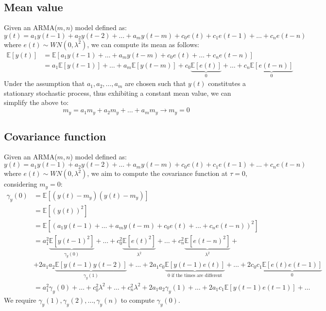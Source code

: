 \subsection{Mean value}
Given an ARMA($m,n$) model defined as:
\[y(t)=a_1y(t-1)+a_2y(t-2)+\dots+a_my(t-m)+c_0e(t)+c_1e(t-1)+\dots+c_ne(t-n)\]
where $e(t)\sim WN(0,\lambda^2)$, we can compute its mean as follows:
\begin{align*}
    \mathbb{E}\left[y(t)\right] &= \mathbb{E}\left[a_1y(t-1)+\dots+a_my(t-m)+c_0e(t)+\dots+c_ne(t-n)\right] \\
                                &= a_1\mathbb{E}\left[y(t-1)\right]+\dots+a_m\mathbb{E}\left[y(t-m)\right] +c_0\underbrace{\mathbb{E}\left[e(t)\right]}_0 +\dots+c_n\underbrace{\mathbb{E}\left[e(t-n)\right]}_0
\end{align*}
Under the assumption that $a_1,a_2,\dots,a_m$ are chosen such that $y(t)$ constitutes a stationary stochastic process, thus exhibiting a constant mean value, we can simplify the above to:
\[m_y=a_1m_y+a_2m_y+\dots+a_mm_y \rightarrow m_y=0\]

\subsection{Covariance function}
Given an ARMA($m,n$) model defined as:
\[y(t)=a_1y(t-1)+a_2y(t-2)+\dots+a_my(t-m)+c_0e(t)+c_1e(t-1)+\dots+c_ne(t-n)\]
where $e(t)\sim WN(0,\lambda^2)$, we aim to compute the covariance function at $\tau=0$, considering $m_y=0$:
\begin{align*}
    \gamma_y(0) &=\mathbb{E}\left[ \left(y(t)-m_y\right)\left(y(t)-m_y\right) \right] \\
                &=\mathbb{E}\left[ \left(y(t)\right)^2 \right] \\
                &=\mathbb{E}\left[ \left(a_1y(t-1)+\dots+a_my(t-m)+c_0e(t)+\dots+c_ne(t-n)\right)^2 \right] \\      
                &=a_1^2\underbrace{\mathbb{E}\left[ y(t-1)^2 \right]}_{\gamma_y(0)} +\dots+c_0^2\underbrace{\mathbb{E}\left[ e(t)^2 \right]}_{\lambda^2} +\dots+c_n^2 \underbrace{\mathbb{E}\left[ e(t-n)^2 \right]}_{\lambda^2}  +\\
                &+ 2a_1a_2\underbrace{\mathbb{E}\left[ y(t-1)y(t-2) \right]}_{\gamma_y(1)}  + \dots + 2a_1c_0\underbrace{\mathbb{E}\left[ y(t-1)e(t) \right]}_{0 \text{ if the times are different}}  + \dots + 2c_0c_1\underbrace{\mathbb{E}\left[ e(t)e(t-1) \right]}_0  \\   
                &=a_1^2\gamma_y(0) +\dots+c_0^2\lambda^2 +\dots+c_n^2 \lambda^2  + 2a_1a_2\gamma_y(1)  + \dots + 2a_1c_1\mathbb{E}\left[ y(t-1)e(t-1) \right]+\dots    
\end{align*}
We require $\gamma_y(1),\gamma_y(2),\dots,\gamma_y(n)$ to compute $\gamma_y(0)$.


